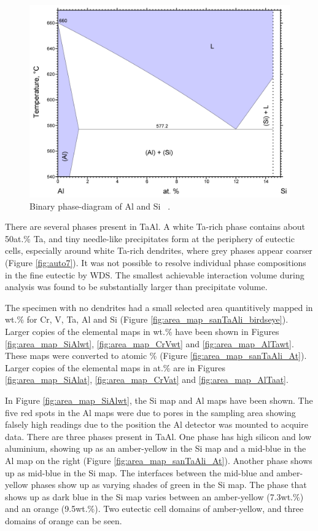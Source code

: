%
\begin{figure}[htbp]
\begin{center}
\includegraphics[width=12cm]{AlSi}
\caption{Binary phase-diagram of Al and Si ~\cite{aoki92}.}
\label{fig:AlSi}
\end{center}
\end{figure}
%
There are several phases present in TaAl.  A white Ta-rich phase contains about 50at.\% Ta, and tiny needle-like precipitates form at the periphery of eutectic cells, especially around white Ta-rich dendrites, where grey phases appear coarser (Figure \ref{fig:auto7}).  It was not possible to resolve individual phase compositions in the fine eutectic by WDS.  The smallest achievable interaction volume during analysis was found to be substantially larger than precipitate volume.  

The specimen with no dendrites had a small selected area quantitively mapped in wt.\%  for Cr, V, Ta, Al and Si (Figure \ref{fig:area_map_sanTaAli_birdseye}).  Larger copies of the elemental maps in wt.\% have been shown in Figures \ref{fig:area_map_SiAlwt}, \ref{fig:area_map_CrVwt} and \ref{fig:area_map_AlTawt}.  These maps were converted to atomic \% (Figure \ref{fig:area_map_sanTaAli_At}).  Larger copies of the elemental maps in at.\% are in Figures \ref{fig:area_map_SiAlat}, \ref{fig:area_map_CrVat} and \ref{fig:area_map_AlTaat}. 

In Figure \ref{fig:area_map_SiAlwt}, the Si map and Al maps have been shown.  The five red spots in the Al maps were due to pores in the sampling area showing falsely high readings due to the position the Al detector was mounted to acquire data.  There are three phases present in TaAl.  One phase has high silicon and low aluminium, showing up as an amber-yellow  in the Si map and a mid-blue in the Al map on the right (Figure \ref{fig:area_map_sanTaAli_At}).  Another phase shows up as mid-blue in the Si map.  The interfaces between the mid-blue and amber-yellow phases show up as varying shades of green in the Si map.  The phase that shows up as dark blue in the Si map varies between an amber-yellow (7.3wt.\%) and an orange (9.5wt.\%).  Two eutectic cell domains of amber-yellow, and three domains of orange can be seen. 

